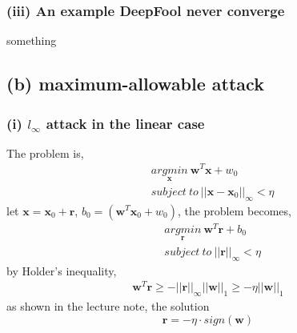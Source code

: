 \documentclass[11pt]{article}
\begin{document}
\subsubsection*{(iii) An example DeepFool never converge}
something
\subsection*{(b) maximum-allowable attack}
\subsubsection*{(i) $l_\infty$ attack in the linear case}
The problem is,
\begin{equation}
\begin{split}
&\underset{\pmb{x}}{argmin}\ \pmb{w}^T\pmb{x}+w_0\\
&subject\ to\ ||\pmb{x}-\pmb{x}_0||_\infty<\eta
\end{split}
\end{equation}
let $\pmb{x}=\pmb{x}_0+\pmb{r}$, $b_0=(\pmb{w}^T\pmb{x}_0+w_0)$, the problem becomes,
\begin{equation}
\begin{split}
&\underset{\pmb{r}}{argmin}\ \pmb{w}^T\pmb{r}+b_0\\
&subject\ to\ ||\pmb{r}||_\infty<\eta
\end{split}
\end{equation}
by Holder's inequality,
\begin{equation}
\begin{split}
\pmb{w}^T\pmb{r} \ge -||\pmb{r}||_\infty||\pmb{w}||_1\ge-\eta||\pmb{w}||_1
\end{split}
\end{equation}
as shown in the lecture note, the solution 
\begin{equation}
\pmb{r} = -\eta\cdot sign(\pmb{w})
\end{equation}
\end{document}
